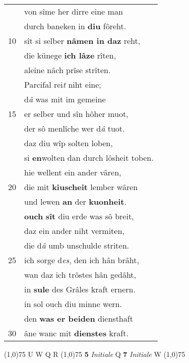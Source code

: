 \documentclass[8pt,a4paper,notitlepage]{article}
\begin{document}
\begin{table}[ht]
\begin{minipage}[t]{0.5\linewidth}
\begin{tabular}{rl}
 & von sîme her dirre eine man\\ 
 & durch baneken in \textbf{diu} fôreht.\\ 
10 & sît si selber \textbf{nâmen in daz} reht,\\ 
 & die künege \textbf{ich lâze} rîten,\\ 
 & aleine nâch prîse strîten.\\ 
 & Parcifal rei\textit{t} niht eine;\\ 
 & d\textit{â} was mit im gemeine\\ 
15 & er selber und sîn hôher muot,\\ 
 & der sô menlîche wer d\textit{â} tuot.\\ 
 & daz diu wîp solten loben,\\ 
 & si \textbf{en}wolten dan durch lôsheit toben.\\ 
 & hie wellent ein ander vâren,\\ 
20 & die mit \textbf{kiuscheit} lember wâren\\ 
 & und lewen \textbf{an} der \textbf{kuonheit}.\\ 
 & \textbf{ouch} \textbf{sît} diu erde was sô breit,\\ 
 & daz ein ander niht vermiten,\\ 
 & die d\textit{â} umb unschulde striten.\\ 
25 & ich sorge d\textit{es}, den ich hân brâht,\\ 
 & wan daz ich trôstes hân gedâht,\\ 
 & in \textbf{sule} des Grâles kraft ernern.\\ 
 & in sol ouch diu minne wern.\\ 
 & den \textbf{was er beiden} diensthaft\\ 
30 & âne wanc mit \textbf{dienstes} kraft.\\ 
\end{tabular}
\scriptsize
\line(1,0){75} \newline
U W Q R \newline
\line(1,0){75} \newline
\textbf{5} \textit{Initiale} Q  \textbf{7} \textit{Initiale} W  \newline
\line(1,0){75} \newline

\end{minipage}
\end{table}
\end{document}

